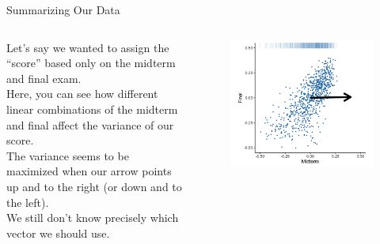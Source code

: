 \documentclass[aspectratio=169]{../latex_main/tntbeamer}  %
\begin{document}
	
	\begin{frame}{Summarizing Our Data}
	    \begin{columns}
	        \begin{column}{.5\textwidth}
	               Let’s say we wanted to assign the “score” based only on the midterm and final exam.\\
	               \bigskip
	               Here, you can see how different linear combinations of the midterm and final affect the variance of our score.\\
	               \bigskip
	               The variance seems to be maximized when our arrow points up and to the right (or down and to the left).\\
	               \bigskip
	               We still don’t know precisely which vector we should use.
	        \end{column}
	        
	        
	        \begin{column}{.5\textwidth}
	                \begin{figure}
	                    \centering
	                    \includegraphics[scale=.55]{Bild7}
	                \end{figure}
	        \end{column}
	    \end{columns}
	\end{frame}
	
\end{document}
